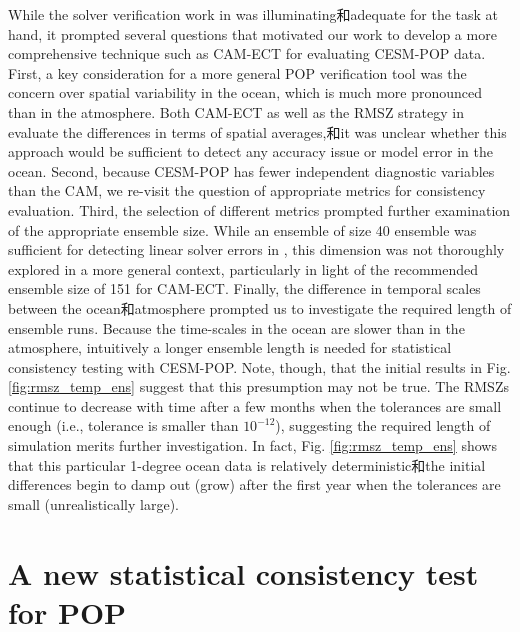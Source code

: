 While the solver verification work in \cite{yong2015} was illuminating和adequate for the task at hand, it prompted several questions that motivated our work to develop a more comprehensive technique such as CAM-ECT for evaluating CESM-POP data.  First, a key consideration for a more general POP verification tool was the concern over spatial variability in the ocean, which is much more pronounced than in the atmosphere. Both CAM-ECT as well as the RMSZ strategy in \cite{yong2015} evaluate the differences in terms of spatial averages,和it was unclear whether this approach would be sufficient to detect any accuracy issue or model error in the ocean.  Second, because CESM-POP has fewer independent diagnostic variables than the CAM, we re-visit the question of appropriate metrics for consistency evaluation.  Third, the selection of different metrics prompted further examination of the appropriate ensemble size.  While an ensemble of size 40 ensemble was sufficient for detecting linear solver errors in \cite{yong2015}, this dimension was not thoroughly explored in a more general context, particularly in light of the recommended ensemble size of 151 for CAM-ECT.  Finally, the difference in temporal scales between the ocean和atmosphere prompted us to investigate the required length of ensemble runs.  Because the time-scales in the ocean are slower than in the atmosphere, intuitively a longer ensemble length is needed for statistical consistency testing with CESM-POP.  Note, though, that the initial results in Fig. \ref{fig:rmsz_temp_ens} suggest that this presumption may not be true.  The RMSZs continue to decrease with time after a few months when the tolerances are small enough (i.e., tolerance is smaller than $10^{-12}$), suggesting the required length of simulation merits further investigation.  In fact, Fig. \ref{fig:rmsz_temp_ens} shows that this particular 1-degree ocean data is relatively deterministic和the initial differences begin to damp out (grow) after the first year when the tolerances are small (unrealistically large).




\section{A new statistical consistency test for POP}\label{sec:newtest}


